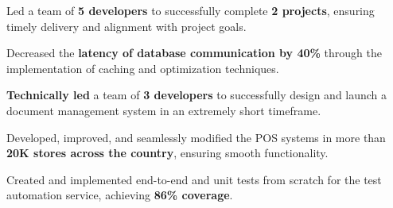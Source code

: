 \begin{tightemize}
    \item Led a team of \textbf{5 developers} to successfully complete \textbf{2 projects}, ensuring timely delivery and alignment with project goals.

    \item Decreased the \textbf{latency of database communication by 40\%} through the implementation of caching and optimization techniques.

\end{tightemize}
\sectionsep


\begin{tightemize}
    \item \textbf{Technically led} a team of \textbf{3 developers} to successfully design and launch a document management system in an extremely short
    timeframe.
\end{tightemize}
\sectionsep

\begin{tightemize}
    \item Developed, improved, and seamlessly modified the POS systems in more than \textbf{20K stores across the country}, ensuring smooth functionality.
\end{tightemize}
\sectionsep

\begin{tightemize}
    \item Created and implemented end-to-end and unit tests from scratch for the test automation service, achieving \textbf{86\% coverage}.
\end{tightemize}
\sectionsep

\sectionsep